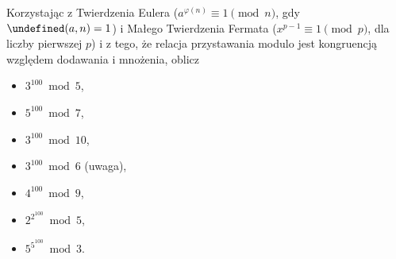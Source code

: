 \documentclass[12pt]{article}
\let\gcd\undefined
\DeclareMathOperator{\gcd}{gcd}
\begin{document}
\begin{enumerate}
	Korzystając z Twierdzenia Eulera ($a^{\varphi(n)} \equiv 1 \pmod n$, gdy $\gcd(a,n)=1$) i Małego Twierdzenia Fermata 
	($x^{p-1}\equiv 1 \pmod p$, dla liczby pierwszej $p$)
	i z tego, że relacja przystawania modulo jest kongruencją
	względem dodawania i mnożenia,
	oblicz
	\begin{itemize}
		\item $3^{100} \bmod 5$,
		\item $5^{100} \bmod 7$,
		\item $3^{100}\bmod 10$,
		\item $3^{100}\bmod 6$ (uwaga),
		\item $4^{100}\bmod 9$,
		\item $2^{2^{100}} \bmod 5$,
		\item $5^{5^{100}} \bmod 3$.
	\end{itemize}
	
\end{enumerate}
\end{document}
